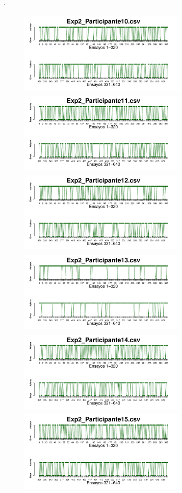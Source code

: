 \documentclass[a4paper ]{article}
\begin{document}
\vfill .
\begin{figure}[th]
\begin{center}
\includegraphics[width=8cm, height=4cm]{Figures/Success_Exp2_P10} \includegraphics[width=8cm, height=4cm]{Figures/Success_Exp2_P11} \includegraphics[width=8cm, height=4cm]{Figures/Success_Exp2_P12}
\includegraphics[width=8cm, height=4cm]{Figures/Success_Exp2_P13} \includegraphics[width=8cm, height=4cm]{Figures/Success_Exp2_P14} \includegraphics[width=8cm, height=4cm]{Figures/Success_Exp2_P15}

\end{center}
\end{figure}
\end{document}
